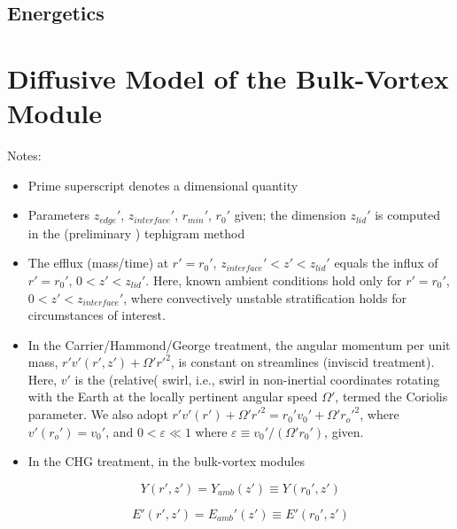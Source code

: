 \documentclass[preprint, prX]{revtex4}
\begin{document}
\subsection{Energetics}

\section{Diffusive Model of the Bulk-Vortex Module}

\begin{figure}[h!]
	\centering
	\def\svgwidth{0.7\columnwidth}
	
\end{figure}

Notes:
\begin{itemize}

\item Prime superscript denotes a dimensional quantity
\item Parameters $z_{edge}'$, $z_{interface}'$, $r_{min}'$, $r_0'$ given; the dimension $z_{lid}'$ is computed in the (preliminary ) tephigram method
\item The efflux (mass/time) at $r' = r_0'$, $z_{interface}' < z' < z_{lid}'$ equals the influx of $r'=r_0'$, $0 < z' < z_{lid}'$. Here, known ambient conditions hold only for $r' = r_0'$, $0 < z' < z_{interface}'$, where convectively unstable stratification holds for circumstances of interest.

\item In the Carrier/Hammond/George treatment, the angular momentum per unit mass, $r' v'(r', z') + \Omega' r'^2$, is constant on streamlines (inviscid treatment). Here, $v'$ is the (relative( swirl, i.e., swirl in non-inertial coordinates rotating with the Earth at the locally pertinent angular speed $\Omega'$, termed the Coriolis parameter. We also adopt $r' v' (r') + \Omega' r'^2 = r_0' v_0' + \Omega' r_o'^2$, where $v'(r_o') = v_0'$, and $0 < \varepsilon \ll 1$ where $\varepsilon \equiv v_0' / (\Omega' r_0')$, given.

\item In the CHG treatment, in the bulk-vortex modules

\begin{equation}
	Y(r', z') = Y_{amb}(z') \equiv Y(r_0', z')
\end{equation}

\begin{equation}
	E'(r',z') = E_{amb}'(z') \equiv E'(r_0', z')
\end{equation}


\end{itemize}
\end{document}
